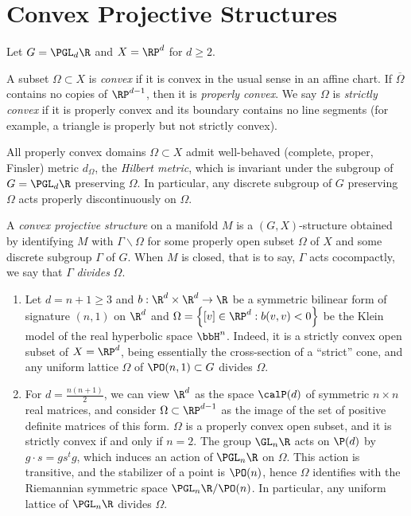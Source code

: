 \documentclass{article}
\begin{document}
\section{Convex Projective Structures}
Let $G = \PGL_d\R$ and $X = \RP^d$ for $d \geq 2$.
\begin{definition}
	A subset $\Omega \subset X$ is \textit{convex} if it is convex in the usual sense in an affine chart. If $\overline{\Omega}$ contains no copies of $\RP^{d - 1}$, then it is \textit{properly convex}. We say $\Omega$ is \textit{strictly convex} if it is properly convex and its boundary contains no line segments (for example, a triangle is properly but not strictly convex). 
\end{definition}

All properly convex domains $\Omega \subset X$ admit well-behaved (complete, proper, Finsler) metric $d_{\Omega}$, the \textit{Hilbert metric}, which is invariant under the subgroup of $G = \PGL_d\R$ preserving $\Omega$. In particular, any discrete subgroup of $G$ preserving $\Omega$ acts properly discontinuously on $\Omega$.

\begin{definition}
	A \textit{convex projective structure} on a manifold $M$ is a $(G,X)$-structure obtained by identifying $M$ with $\Gamma\backslash \Omega$ for some properly open subset $\Omega$ of $X$ and some discrete subgroup $\Gamma$ of $G$. When $M$ is closed, that is to say, $\Gamma$ acts cocompactly, we say that $\Gamma$ \textit{divides} $\Omega$.  
\end{definition}

\begin{example}
	\begin{enumerate}
		\item Let $d = n + 1 \geq 3$ and $b: \R^d \times \R^d \to \R$ be a symmetric bilinear form of signature $(n,1)$ on $\R^d$ and $\Omega = \left\{ [v] \in \RP^d : b(v,v) < 0 \right\}$ be the Klein model of the real hyperbolic space $\bbH^n$. Indeed, it is a strictly convex open subset of $X = \RP^d$, being essentially the cross-section of a ``strict'' cone, and any uniform lattice $\Omega$ of $\PO(n,1) \subset G$ divides $\Omega$.
		\item For $d = \frac{n(n + 1)}{2}$, we can view $\R^d$ as the space $\calP(d)$ of symmetric $n \times n$ real matrices, and consider $\Omega \subset \RP^{d - 1}$ as the image of the set of positive definite matrices of this form. $\Omega$ is a properly convex open subset, and it is strictly convex if and only if $n = 2$. The group $\GL_n\R$ acts on $\P(d)$ by $g \cdot s = gs^tg$, which induces an action of $\PGL_n\R$ on $\Omega$. This action is transitive, and the stabilizer of a point is $\PO(n)$, hence $\Omega$ identifies with the Riemannian symmetric space $\PGL_n\R/\PO(n)$. In particular, any uniform lattice of $\PGL_n\R$ divides $\Omega$.
	\end{enumerate}
\end{example}
\end{document}
